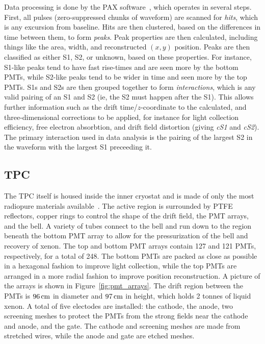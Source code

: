 Data processing is done by the PAX software~\cite{pax}, which operates in several steps. First, all pulses (zero-suppressed chunks of waveform) are scanned for \textit{hits}, which is any excursion from baseline. Hits are then clustered, based on the differences in time between them, to form \textit{peaks}. Peak properties are then calculated, including things like the area, width, and reconstructed $(x,y)$ position. Peaks are then classified as either S1, S2, or unknown, based on these properties. For instance, S1-like peaks tend to have fast rise-times and are seen more by the bottom PMTs, while S2-like peaks tend to be wider in time and seen more by the top PMTs. S1s and S2s are then grouped together to form \textit{interactions}, which is any valid pairing of an S1 and S2 (ie, the S2 must happen after the S1). This allows further information such as the drift time/$z$-coordinate to the calculated, and three-dimensional corrections to be applied, for instance for light collection efficiency, free electron absorbtion, and drift field distortion (giving \textit{cS1} and \textit{cS2}). The primary interaction used in data analysis is the pairing of the largest S2 in the waveform with the largest S1 preceeding it.

\subsection{TPC}

The TPC itself is housed inside the inner cryostat and is made of only the most radiopure materials available~\cite{Aprile:2017ilq}. The active region is surrounded by PTFE reflectors, copper rings to control the shape of the drift field, the PMT arrays, and the bell. A variety of tubes connect to the bell and run down to the region beneath the bottom PMT array to allow for the pressurization of the bell and recovery of xenon. The top and bottom PMT arrays contain 127 and 121 PMTs, respectively, for a total of 248. The bottom PMTs are packed as close as possible in a hexagonal fashion to improve light collection, while the top PMTs are arranged in a more radial fashion to improve position reconstruction. A picture of the arrays is shown in Figure~\ref{fig:pmt_arrays}. The drift region between the PMTs is $96\,\mathrm{cm}$ in diameter and $97\,\mathrm{cm}$ in height, which holds 2 tonnes of liquid xenon. A total of five electodes are installed: the cathode, the anode, two screening meshes to protect the PMTs from the strong fields near the cathode and anode, and the gate. The cathode and screening meshes are made from stretched wires, while the anode and gate are etched meshes.

